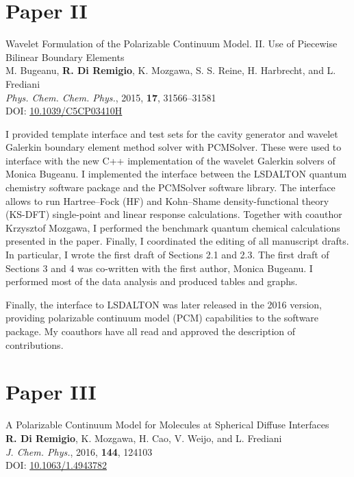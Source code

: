 \documentclass[notitlepage,a4paper,11pt,dvipsnames]{article}
\newcommand*{\paper}[1]{\textbf{Paper #1}}
\begin{document}
\section*{\paper{II}}

\begin{tcolorbox}
  {\small
  \textsf{Wavelet Formulation of the Polarizable Continuum Model. II. Use of
  Piecewise Bilinear Boundary Elements
  }
  \\
  M. Bugeanu, \textbf{R. Di Remigio}, K. Mozgawa, S. S. Reine, H.
  Harbrecht,  and L. Frediani
  \\
  \textit{Phys. Chem. Chem. Phys.}, \textrm{2015}, \textbf{17},
  31566--31581
  \\
  DOI: \url{10.1039/C5CP03410H}
  }
\end{tcolorbox}

I provided template interface and test sets for the cavity
generator and wavelet Galerkin
boundary element method solver with PCMSolver.
These were used to interface with the new C++ implementation of the wavelet
Galerkin solvers of Monica Bugeanu.
I implemented the interface between the LSDALTON quantum chemistry software
package and the PCMSolver software library. The interface allows to run Hartree--Fock (HF) and
Kohn--Shame density-functional theory (KS-DFT)
single-point and linear response calculations.
Together with coauthor Krzysztof Mozgawa, I performed the benchmark quantum
chemical calculations presented in the paper.
Finally, I coordinated the editing of all manuscript drafts.
In particular, I wrote the first draft of Sections 2.1 and 2.3.
The first draft of Sections 3 and 4 was co-written with the first author, Monica Bugeanu.
I performed most of the data analysis and produced tables and graphs.

Finally, the interface to LSDALTON was later released in the 2016 version,
providing polarizable continuum model (PCM) capabilities to the software package.
My coauthors have all read and approved the description of contributions.

\section*{\paper{III}}

\begin{tcolorbox}
  {\small
  \textsf{A Polarizable Continuum Model for Molecules at Spherical
  Diffuse Interfaces
  }
  \\
  \textbf{R. Di Remigio}, K. Mozgawa, H. Cao, V. Weijo, and L.
  Frediani
  \\
  \textit{J. Chem. Phys.}, \textrm{2016}, \textbf{144}, 124103
  \\
  DOI: \url{10.1063/1.4943782}
  }
\end{tcolorbox}
\end{document}
